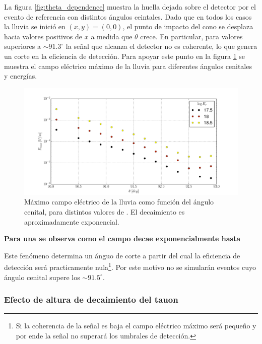 	La figura \ref{fig:theta_dependence} muestra la huella dejada sobre el detector por el evento de referencia con distintos \'angulos ceintales.
	Dado que en todos los casos la lluvia se inici\'o en $(x,y)=(0,0)$, el punto de impacto del cono \cher{} se desplaza hacia valores positivos de $x$ a medida que $\theta$ crece.
	En particular, para valores superiores a $\sim91.3^\circ$ la se\~nal que alcanza el detector no es coherente, lo que genera un corte en la eficiencia de detecci\'on.
	Para apoyar este punto en la figura \ref{fig:theta_dependence2} se muestra el campo el\'ectrico m\'aximo de la lluvia para diferentes \'angulos cenitales y energ\'ias.
	\begin{figure}[ht!]
		\centering
		\includegraphics[width=\textwidth]{./fig/simulacionRadio/maxDep/eMaxTh}
		\caption{\label{fig:theta_dependence2}
		M\'aximo campo el\'ectrico de la lluvia como funci\'on del \'angulo cenital, para distintos valores de \ev{}. El decaimiento es aproximadamente exponencial.
		}
	\end{figure}
	\textbf{Para una se observa como el campo decae exponencialmente hasta }
	
	Este fen\'omeno determina un \'anguo de corte a partir del cual la eficiencia de detecci\'on ser\'a practicamente nula\footnote{Si la coherencia de la se\~nal es baja el campo el\'ectrico m\'aximo ser\'a peque\~no y por ende la se\~nal no superar\'a los umbrales de detecci\'on.}.
	Por este motivo no se simular\'an eventos cuyo \'angulo cenital supere los $\sim91.5^\circ$.
	
	\subsubsection{Efecto de altura de decaimiento del tauon \xd{}}
	
